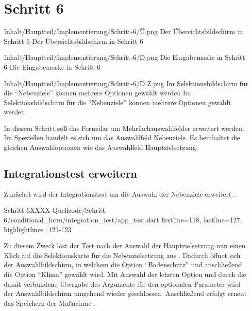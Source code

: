 \chapter{Schritt 6}
\label{chap:Schritt-6}


\begin{alexfigure}{Inhalt/Hauptteil/Implementierung/Schritt-6/Ü.png}
  {Der Übersichtsbildschirm in Schritt 6}
  {Der Übersichtsbildschirm in Schritt 6}

  \label{fig:Schritt4Eingabemaske}

\end{alexfigure}

\begin{alexfigure}{Inhalt/Hauptteil/Implementierung/Schritt-6/D.png}
  {Die Eingabemaske in Schritt 6}
  {Die Eingabemaske in Schritt 6}

  \label{fig:Schritt4Eingabemaske}

\end{alexfigure}


\begin{alexfigure}{Inhalt/Hauptteil/Implementierung/Schritt-6/D Z.png}
  {Im Selektionsbildschirm für die \enquote{Nebenziele} können mehrere Optionen gewählt werden}
  {Im Selektionsbildschirm für die \enquote{Nebenziele} können mehrere Optionen gewählt werden}

  \label{fig:Schritt4Eingabemaske}

\end{alexfigure}

In diesem Schritt soll das Formular um Mehrfachauswahlfelder erweitert werden.
Im Speziellen handelt es sich um das Auswahlfeld Nebenziele.
Es beinhaltet die gleichen Auswahloptionen wie das Auswahlfeld Hauptzielsetzung.

\section{Integrationstest erweitern}

Zunächst wird der Integrationstest um die Auswahl der Nebenziele erweitert \Lst{\ref{lst:Schritt6tabSelectionCard}}.

\begin{alexlisting}{Schritt 6}{XXXX}
  {Quellcode/Schritt-6/conditional_form/integration_test/app_test.dart}
  {firstline=118, lastline=127, highlightlines={121-123}}
  \label{lst:Schritt6tabSelectionCard}
\end{alexlisting}

Zu diesem Zweck löst der Test nach der Auswahl der Hauptzielsetzung  nun einen Klick auf die Selektionskarte für die Nebenzielsetzung aus .
Dadurch öffnet sich der Auswahlbildschirm,
in welchem die Option \enquote{Bodenschutz}  und anschließend die Option \enquote{Klima}  gewählt wird.
Mit Auswahl der letzten Option
und durch die damit verbundene Übergabe des Arguments  für den optionalen Parameter  wird der Auswahlbildschirm umgehend wieder geschlossen.
Anschließend erfolgt erneut das Speichern der Maßnahme .



